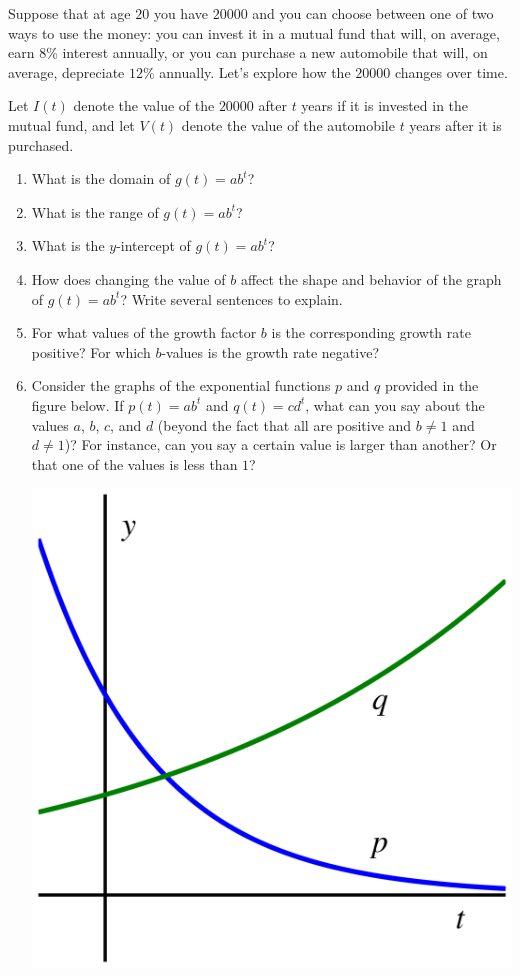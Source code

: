 \documentclass[nooutcomes]{ximera}
\begin{document}
\begin{exploration}
Suppose that at age $20$ you have \textdollar{}$20000$ and you can choose between one of two ways to use the money:  you can invest it in a mutual fund that will, on average, earn $8$\% interest annually, or you can purchase a new automobile that will, on average, depreciate $12$\% annually.  Let's explore how the $20000$ changes over time.%

Let $I(t)$ denote the value of the \textdollar{}$20000$ after $t$ years if it is invested in the mutual fund, and let $V(t)$ denote the value of the automobile $t$ years after it is purchased.

\begin{enumerate}[label=\alph*.]
\item What is the domain of $g(t) = ab^t$?
\item What is the range of $g(t) = ab^t$?
\item What is the $y$-intercept of $g(t) = ab^t$?
\item How does changing the value of $b$ affect the shape and behavior of the graph of $g(t) = ab^t$?  Write several sentences to explain.
\item For what values of the growth factor $b$ is the corresponding growth rate positive?  For which $b$-values is the growth rate negative?
\item Consider the graphs of the exponential functions $p$ and $q$ provided in the figure below.  If $p(t) = ab^t$ and $q(t) = cd^t$, what can you say about the values $a$, $b$, $c$, and $d$ (beyond the fact that all are positive and $b \ne 1$ and $d \ne 1$)?  For instance, can you say a certain value is larger than another?  Or that one of the values is less than $1$?
\begin{image}
\includegraphics{growth-act-a-b-t.jpg}
\end{image}
\end{enumerate}
\end{exploration}
\end{document}
